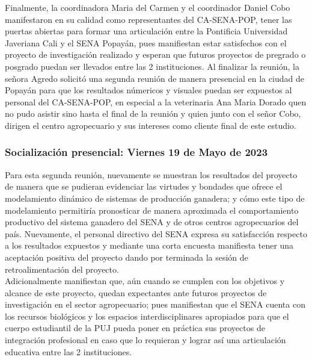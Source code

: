 Finalmente, la coordinadora Maria del Carmen y el coordinador Daniel Cobo manifestaron en su calidad como representantes del CA-SENA-POP, tener las puertas abiertas para formar una articulación entre la Pontificia Universidad Javeriana Cali y el SENA Popayán, pues manifiestan estar satisfechos con el proyecto de investigación realizado y esperan que futuros proyectos de pregrado o posgrado puedan ser llevados entre las 2 instituciones.
Al finalizar la reunión, la señora Agredo solicitó una segunda reunión de manera presencial en la ciudad de Popayán para que los resultados númericos y visuales puedan ser expuestos al personal del CA-SENA-POP, en especial a la veterinaria Ana Maria Dorado quen no pudo asistir sino hasta el final de la reunión y quien junto con el señor Cobo, dirigen el centro agropecuario y sus intereses como cliente final de este estudio.

\subsubsection{Socialización presencial: Viernes 19 de Mayo de 2023}

Para esta segunda reunión, nuevamente se muestran los resultados del proyecto de manera que se pudieran evidenciar las virtudes y bondades que ofrece el modelamiento dinámico de sistemas de producción ganadera; y cómo este tipo de modelamiento permitiría pronosticar de manera aproximada el comportamiento productivo del sistema ganadero del SENA y de otros centros agropecuarios del país. Nuevamente, el personal directivo del SENA expresa su satisfacción respecto a los resultados expuestos y mediante una corta encuesta manifiesta tener una aceptación positiva del proyecto dando por terminada la sesión de retroalimentación del proyecto. \\

Adicionalmente manifiestan que, aún cuando se cumplen con los objetivos y alcance de este proyecto, quedan expectantes ante futuros proyectos de investigación en el sector agropecuario; pues manifiestan que el SENA cuenta con los recursos biológicos y los espacios interdisciplinares apropiados para que el cuerpo estudiantil de la PUJ pueda poner en práctica sus proyectos de integración profesional en caso que lo requieran y lograr así una articulación educativa entre las 2 instituciones.
